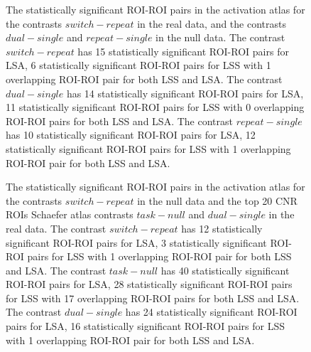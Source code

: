 \documentclass[10pt,letterpaper]{article}
\begin{document}
\begin{figure}[H]
    \ContinuedFloat
    \centering



    \caption{
        The statistically significant ROI-ROI pairs in the activation atlas for the contrasts
        $switch - repeat$ in the real data, and the contrasts $dual - single$ and $repeat - single$
        in the null data.
        The contrast $switch - repeat$ has 15 statistically significant ROI-ROI
        pairs for LSA, 6 statistically significant ROI-ROI pairs
        for LSS with 1 overlapping ROI-ROI pair for both LSS and LSA.
        The contrast $dual - single$ has 14 statistically significant ROI-ROI
        pairs for LSA, 11 statistically significant ROI-ROI pairs
        for LSS with 0 overlapping ROI-ROI pairs for both LSS and LSA.
        The contrast $repeat - single$ has 10 statistically significant ROI-ROI
        pairs for LSA, 12 statistically significant ROI-ROI pairs
        for LSS with 1 overlapping ROI-ROI pair for both LSS and LSA.
    }
    \label{fig:significant-contrasts}
\end{figure}

\begin{figure}[H]
    \ContinuedFloat
    \centering



    \caption{
        The statistically significant ROI-ROI pairs in the activation atlas for the contrasts
        $switch - repeat$ in the null data and the top 20 CNR ROIs Schaefer atlas
        contrasts $task - null$ and $dual - single$ in the real data.
        The contrast $switch - repeat$ has 12 statistically significant ROI-ROI
        pairs for LSA, 3 statistically significant ROI-ROI pairs
        for LSS with 1 overlapping ROI-ROI pair for both LSS and LSA.
        The contrast $task - null$ has 40 statistically significant ROI-ROI
        pairs for LSA, 28 statistically significant ROI-ROI pairs
        for LSS with 17 overlapping ROI-ROI pairs for both LSS and LSA.
        The contrast $dual - single$ has 24 statistically significant ROI-ROI
        pairs for LSA, 16 statistically significant ROI-ROI pairs
        for LSS with 1 overlapping ROI-ROI pair for both LSS and LSA.
    }
    \label{fig:significant-contrasts}
\end{figure}
\end{document}
